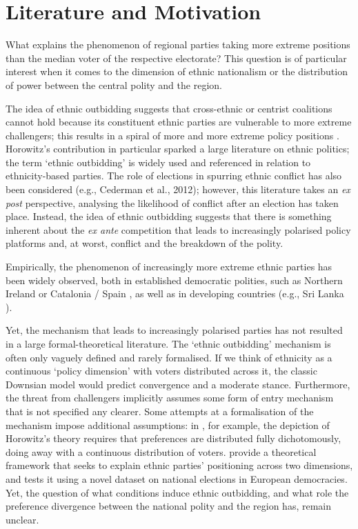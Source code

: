 \documentclass[11pt]{article}
\begin{document}
\section{Literature and Motivation}

What explains the phenomenon of regional parties taking more extreme positions than the median voter of the respective electorate? This question is of particular interest when it comes to the dimension of ethnic nationalism or the distribution of power between the central polity and the region.

The idea of ethnic outbidding suggests that cross-ethnic or centrist coalitions cannot hold because its constituent ethnic parties are vulnerable to more extreme challengers; this results in a spiral of more and more extreme policy positions \parencite{Horowitz2000, Rabushka1972, Chandra2005}. Horowitz's contribution in particular sparked a large literature on ethnic politics; the term `ethnic outbidding' is widely used and referenced in relation to ethnicity-based parties. The role of elections in spurring ethnic conflict has also been considered (e.g., Cederman et al., 2012); however, this literature takes an \textit{ex post} perspective, analysing the likelihood of conflict after an election has taken place. Instead, the idea of ethnic outbidding suggests that there is something inherent about the \textit{ex ante} competition that leads to increasingly polarised policy platforms and, at worst, conflict and the breakdown of the polity.

Empirically, the phenomenon of increasingly more extreme ethnic parties has been widely observed, both in established democratic polities, such as Northern Ireland \parencite{Coakley2008, Mitchell2009, Moore2014,DeFazio2016} or Catalonia / Spain \parencite{Barrio2017}, as well as in developing countries (e.g., Sri Lanka \textcite{DeVotta2005}).

Yet, the mechanism that leads to increasingly polarised parties has not resulted in a large formal-theoretical literature. The `ethnic outbidding' mechanism is often only vaguely defined and rarely formalised. If we think of ethnicity as a continuous `policy dimension' with voters distributed across it, the classic Downsian model would predict convergence and a moderate stance. Furthermore, the threat from challengers implicitly assumes some form of entry mechanism that is not specified any clearer. Some attempts at a formalisation of the mechanism impose additional assumptions: in \textcite{Chandra2005}, for example, the depiction of Horowitz's theory requires that preferences are distributed fully dichotomously, doing away with a continuous distribution of voters. \textcite{Zuber2015} provide a theoretical framework that seeks to explain ethnic parties' positioning across two dimensions, and tests it using a novel dataset on national elections in European democracies. Yet, the question of what conditions induce ethnic outbidding, and what role the preference divergence between the national polity and the region has, remain unclear.
\end{document}
